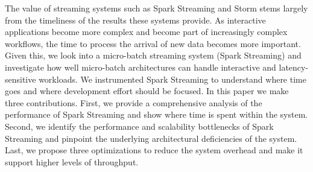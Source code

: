 The value of streaming systems such as Spark Streaming and Storm stems largely from the timeliness of the results these systems provide.
As interactive applications become more complex and become part of increasingly complex workflows, the time to process the arrival of new data becomes more important.
Given this, we look into a micro-batch streaming system (Spark Streaming) and investigate how well micro-batch architectures can handle interactive and latency-sensitive workloads. 
We instrumented Spark Streaming to understand where time goes and where development effort should be focused.
In this paper we make three contributions. 
First, we provide a comprehensive analysis of the performance of Spark Streaming and show where time is spent within the system. 
Second, we identify the performance and scalability bottlenecks of Spark Streaming and pinpoint the underlying architectural deficiencies of the system. 
Last, we propose three optimizations to reduce the system overhead and make it support higher levels of throughput.
        

